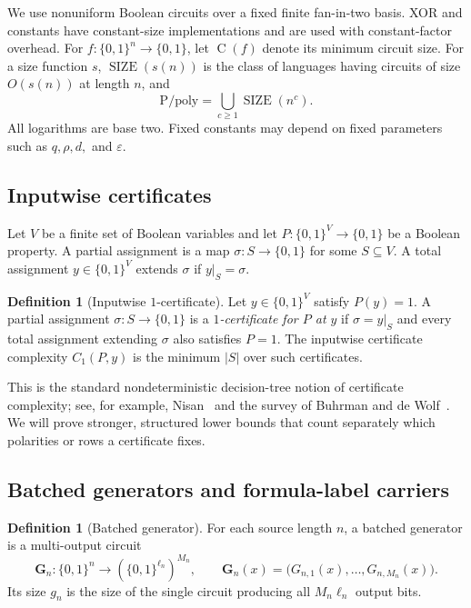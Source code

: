 \documentclass[11pt]{article}
\theoremstyle{definition}
\newtheorem{definition}[theorem]{Definition}
\newcommand{\bits}{\{0,1\}}
\newcommand{\SIZE}{\operatorname{SIZE}}
\newcommand{\Ckt}{\operatorname{C}}
\newcommand{\Ppoly}{\mathrm{P/poly}}
\newcommand{\eps}{\varepsilon}
\newcommand{\Gn}{\mathbf{G}_n}
\begin{document}
We use nonuniform Boolean circuits over a fixed finite fan-in-two basis.  XOR and constants have constant-size implementations and are used with constant-factor overhead.  For $f:\bits^n\to\bits$, let $\Ckt(f)$ denote its minimum circuit size.  For a size function $s$, $\SIZE(s(n))$ is the class of languages having circuits of size $O(s(n))$ at length $n$, and
\[
  \Ppoly=\bigcup_{c\ge1}\SIZE(n^c).
\]
All logarithms are base two.  Fixed constants may depend on fixed parameters such as $q,\rho,d,$ and $\eps$.

\subsection{Inputwise certificates}

Let $V$ be a finite set of Boolean variables and let $P:\bits^V\to\bits$ be a Boolean property.  A partial assignment is a map $\sigma:S\to\bits$ for some $S\subseteq V$.  A total assignment $y\in\bits^V$ extends $\sigma$ if $y|_S=\sigma$.

\begin{definition}[Inputwise $1$-certificate]\label{def:certificate}
Let $y\in\bits^V$ satisfy $P(y)=1$.  A partial assignment $\sigma:S\to\bits$ is a \emph{$1$-certificate for $P$ at $y$} if $\sigma=y|_S$ and every total assignment extending $\sigma$ also satisfies $P=1$.
The inputwise certificate complexity $C_1(P,y)$ is the minimum $|S|$ over such certificates.
\end{definition}

This is the standard nondeterministic decision-tree notion of certificate complexity; see, for example, Nisan~\cite{Nisan91} and the survey of Buhrman and de Wolf~\cite{BuhrmanDeWolf02}.  We will prove stronger, structured lower bounds that count separately which polarities or rows a certificate fixes.

\subsection{Batched generators and formula-label carriers}

\begin{definition}[Batched generator]\label{def:generator}
For each source length $n$, a batched generator is a multi-output circuit
\[
  \Gn:\bits^n\longrightarrow(\bits^{\ell_n})^{M_n},
  \qquad
  \Gn(x)=\bigl(G_{n,1}(x),\ldots,G_{n,M_n}(x)\bigr).
\]
Its size $g_n$ is the size of the single circuit producing all $M_n\ell_n$ output bits.
\end{definition}
\end{document}
